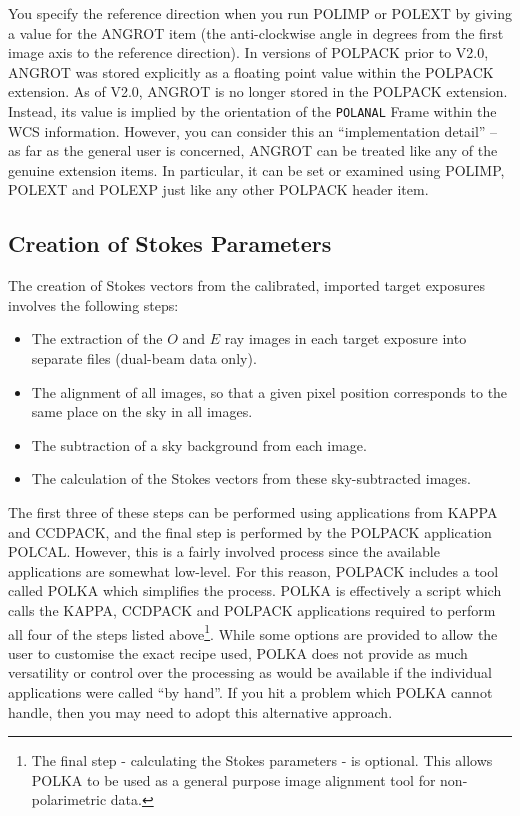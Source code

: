 \documentclass[twoside,11pt]{article}
\newcommand{\htmlref}[2]{#1}
\renewcommand{\_}{\texttt{\symbol{95}}}
\begin{document}
You specify the reference direction when you run POLIMP or POLEXT by
giving a value for the ANGROT item (the anti-clockwise angle in degrees
from the first image axis to the reference direction). In versions of
POLPACK prior to V2.0, ANGROT was stored explicitly as a floating point
value within the POLPACK extension. As of V2.0, ANGROT is no longer
stored in the POLPACK extension. Instead, its value is implied by the
orientation of the \verb+POLANAL+ Frame within the WCS information.
However, you can consider this an ``implementation detail'' -- as far as
the general user is concerned, ANGROT can be treated like any of the
genuine extension items. In particular, it can be set or examined using
POLIMP, POLEXT and POLEXP just like any other POLPACK header item.

\subsection{Creation of Stokes Parameters}
The creation of Stokes vectors from the calibrated, imported 
target exposures involves the following steps:

\begin{itemize}
\item The extraction of the $O$ and $E$ ray images in each target
exposure into separate files (dual-beam data only).
\item The alignment of all images, so
that a given pixel position corresponds to the same place on the sky in
all images.
\item The subtraction of a sky background from each image.
\item The calculation of the Stokes vectors from these sky-subtracted
images.
\end{itemize}

The first three of these steps can be performed using applications from
KAPPA and CCDPACK, and the final step is performed by the POLPACK
application \htmlref{POLCAL}{POLCAL}. However, this is a fairly involved
process since the available applications are somewhat low-level. For this
reason, POLPACK includes a tool called \htmlref{POLKA}{POLKA} which
simplifies the process. POLKA is effectively a script which calls the
KAPPA, CCDPACK and POLPACK applications required to perform all four of
the steps listed above\footnote{The final step - calculating the Stokes
parameters - is optional. This allows POLKA to be used as a general
purpose image alignment tool for non-polarimetric data.}. While some
options are provided to allow the user to customise the exact recipe
used, POLKA does not provide as much versatility or control over the
processing as would be available if the individual applications were
called ``by hand''. If you hit a problem which POLKA cannot handle, then
you may need to adopt this alternative approach. 
\end{document}
